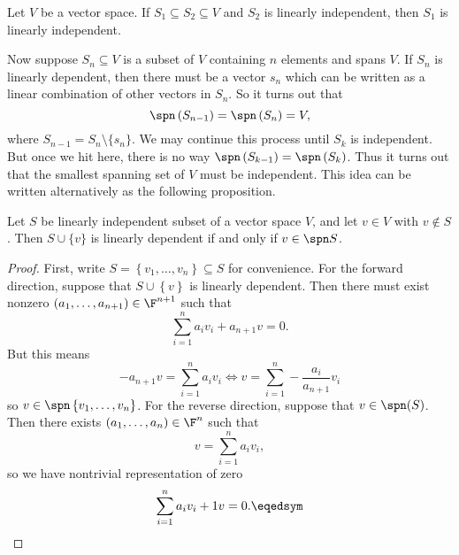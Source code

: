 \documentclass[linearalgebra]{subfiles}
\begin{document}
    \begin{cor}{}
        Let $V$ be a vector space. If $S_1\subseteq S_2\subseteq V$ and $S_2$ is linearly independent, then $S_1$ is linearly independent.
    \end{cor}	

    \begin{remark}
        Now suppose $S_n\subseteq V$ is a subset of $V$ containing $n$ elements and spans $V$. If $S_n$ is linearly dependent, then there must be a vector $s_n$ which can be written as a linear combination of other vectors in $S_n$. So it turns out that
        \begin{equation*}
            \spn \left( S_{n-1} \right)  = \spn\left( S_n \right)  = V,
        \end{equation*}
        where $S_{n-1} = S_n\setminus \lbrace s_n \rbrace$. We may continue this process until $S_k$ is independent. But once we hit here, there is no way $\spn \left( S_{k-1} \right)  = \spn\left( S_k \right) $. Thus it turns out that the smallest spanning set of $V$ must be independent. This idea can be written alternatively as the following proposition.
    \end{remark}

    \begin{prop}{}
        Let $S$ be linearly independent subset of a vector space $V$, and let $v\in V$ with $v\notin S$. Then $S\cup \lbrace v \rbrace$ is linearly dependent if and only if $v\in \spn S$.
    \end{prop}

    \begin{proof}
        First, write $S = \left\lbrace v_1, \ldots, v_n \right\rbrace \subseteq S$ for convenience. For the forward direction, suppose that $S\cup \left\lbrace v \right\rbrace$ is linearly dependent. Then there must exist nonzero $(a_1, \ldots, a_{n+1})\in \F^{n+1}$ such that
        \begin{equation*}
            \sum^{n}_{i=1} a_iv_i + a_{n+1}v = 0.
        \end{equation*}
        But this means
        \begin{equation*}
            -a_{n+1}v = \sum^n_{i=1} a_iv_i \iff v = \sum^n_{i=1} -\frac{a_i}{a_{n+1}}v_i
        \end{equation*}
        so $v\in \spn \left\lbrace v_1, \ldots, v_n \right\rbrace$. For the reverse direction, suppose that $v\in \spn(S)$. Then there exists $(a_1, \ldots, a_n)\in \F^n$ such that
        \begin{equation*}
            v = \sum^n_{i=1} a_iv_i,
        \end{equation*}
        so we have nontrivial representation of zero
        \begin{equation*}
            \sum^n_{i=1} a_iv_i + 1v = 0. \eqedsym
        \end{equation*}
    \end{proof}
\end{document}
